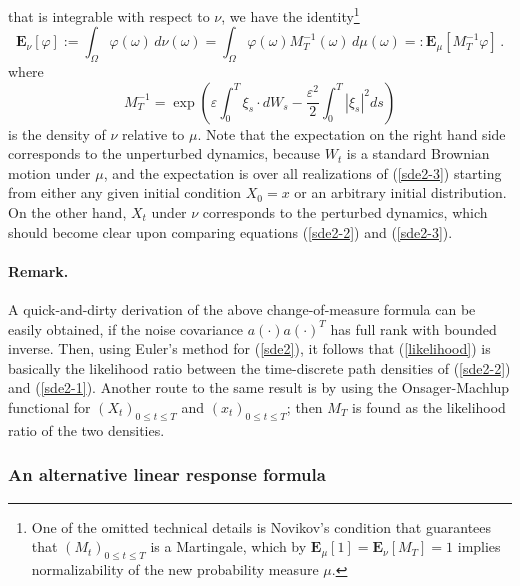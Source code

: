 \documentclass[]{tMPH2e}
\newcommand{\eps}{\varepsilon}
\newcommand{\bE}{{\mathbf E}}
\newcommand{\wrt}{with respect to }
\begin{document}
that is integrable \wrt $\nu$, we have the identity\footnote{One of the omitted technical details is Novikov's condition \cite[pp.~162]{oksendal2003stochastic} that guarantees that $(M_{t})_{0\le t\le T}$ is a Martingale, which by $\bE_{\mu}[1]=\bE_{\nu}[M_{T}]=1$ implies normalizability of the new probability measure $\mu$.}
\[
\bE_{\nu}[\varphi] := \int_{\Omega} \varphi(\omega)\, d\nu(\omega) = \int_{\Omega} \varphi(\omega) M_{T}^{-1}(\omega)\,d\mu(\omega) =: \bE_{\mu}[M^{-1}_{T}\varphi]\,.
\]
where 
\[
M_{T}^{-1} = \exp\left(\eps\int_{0}^{T}\xi_{s}\cdot dW_{s} - \frac{\eps^{2}}{2}\int_{0}^{T}|\xi_{s}|^{2}ds\right)
\]
is the density of $\nu$ relative to $\mu$. Note that the expectation on the right hand side corresponds to the unperturbed dynamics, because $W_{t}$ is a standard Brownian motion under $\mu$, and the expectation is over all realizations of (\ref{sde2-3}) starting from either any given initial condition $X_{0}=x$ or an arbitrary initial distribution. On the other hand, $X_{t}$ under $\nu$ corresponds to the perturbed dynamics, which should become clear upon comparing equations (\ref{sde2-2}) and (\ref{sde2-3}). 


\paragraph*{Remark.} 

A quick-and-dirty derivation of the above change-of-measure formula can be easily obtained, if the noise covariance $a(\cdot)a(\cdot)^{T}$ has full rank with bounded inverse. Then, using Euler's method for (\ref{sde2}), it follows that (\ref{likelihood}) is basically the likelihood ratio between the time-discrete path densities of (\ref{sde2-2}) and (\ref{sde2-1}).  Another route to the same result is by using the Onsager-Machlup functional \cite{Pinski1} for $(X_t)_{0\le t\le T}$ and $(x_t)_{0\le t\le T}$; then $M_{T}$ is found as the likelihood ratio of the two densities. 






\subsubsection*{An alternative linear response formula}
\end{document}
